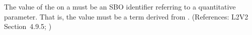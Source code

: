The value of the   on a \Parameter must be an SBO
identifier referring to a quantitative parameter.  That is, the value must
be a term derived from \sboparameter.  (References: L2V2 Section~4.9.5; )
